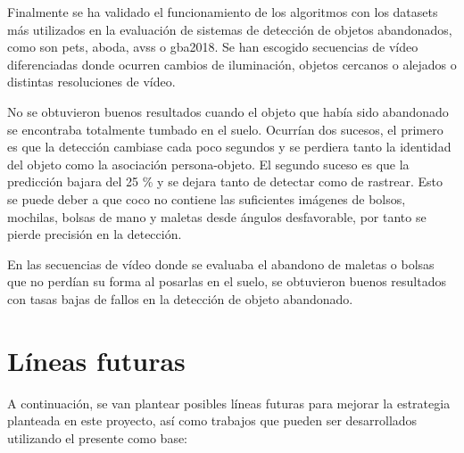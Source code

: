 Finalmente se ha validado el funcionamiento de los algoritmos con los datasets más utilizados en la evaluación de sistemas de detección de objetos abandonados, como son \gls{pets}, \gls{aboda}, \gls{avss} o \gls{gba2018}. Se han escogido secuencias de vídeo diferenciadas donde ocurren cambios de iluminación, objetos cercanos o alejados o distintas resoluciones de vídeo.

No se obtuvieron buenos resultados cuando el objeto que había sido abandonado se encontraba totalmente tumbado en el suelo. Ocurrían dos sucesos, el primero es que la detección cambiase cada poco segundos y se perdiera tanto la identidad del objeto como la asociación persona-objeto. El segundo suceso es que la predicción bajara del 25 \% y se dejara tanto de detectar como de rastrear. Esto se puede deber a que \gls{coco} no contiene las suficientes imágenes de bolsos, mochilas, bolsas de mano y maletas desde ángulos desfavorable, por tanto se pierde precisión en la detección.

En las secuencias de vídeo donde se evaluaba el abandono de maletas o bolsas que no perdían su forma al posarlas en el suelo, se obtuvieron buenos resultados con tasas bajas de fallos en la detección de objeto abandonado.

\section{Líneas futuras}
\label{sec:lineas-futuras}

A continuación, se van plantear posibles líneas futuras para mejorar la estrategia planteada en este proyecto, así como trabajos que pueden ser desarrollados utilizando el presente como base: 

